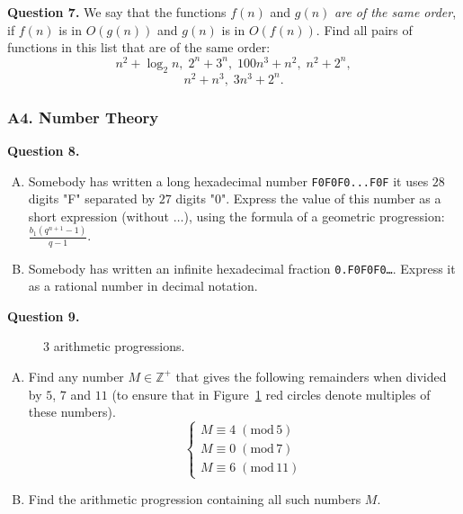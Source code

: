 \documentclass[jou]{apa6}
\begin{document}
\vspace{6pt}
{\bf Question 7.} We say that the functions $f(n)$ and $g(n)$
{\em are of the same order}, if $f(n)$ is in $O(g(n))$ and
$g(n)$ is in $O(f(n))$. Find all pairs of functions in this 
list that are of the same order:
$$n^2 + \log_2 n,\; 2^n + 3^n,\; 100n^3 + n^2,\; n^2 + 2^n,$$
$$n^2 + n^3,\;3n^3 + 2^n.$$






\subsubsection{A4. Number Theory}


{\bf Question 8.}
\begin{enumerate}[(A)]
\item
Somebody has written a long hexadecimal number
{\tt F0F0F0...F0F} \textendash{} it uses $28$ digits "F"
separated by $27$ digits "0". 
Express the value of this number as a short expression
(without $\ldots$), using
the formula of a geometric progression: $\frac{b_1(q^{n+1}-1)}{q - 1}$. 
\item 
Somebody has written an infinite hexadecimal fraction 
{\tt 0.F0F0F0\ldots}. Express it as a rational number in 
decimal notation. 
\end{enumerate}



\vspace{6pt}
{\bf Question 9.} 

\begin{figure}[!htb]
\caption{\label{fig:arithmetic-sequences} 3 arithmetic progressions.}
\end{figure}

\begin{enumerate}[(A)]
\item Find any number $M \in \mathbb{Z}^{+}$ 
that gives the following remainders when divided by 
$5$, $7$ and $11$ (to ensure that in Figure~\ref{fig:arithmetic-sequences}
red circles denote multiples of these numbers). 
$$\left\{
\begin{array}{l}
M \equiv 4\;(\text{mod}\,5)\\
M \equiv 0\;(\text{mod}\,7)\\
M \equiv 6\;(\text{mod}\,11)
\end{array} \right.$$
\item Find the arithmetic progression containing all such numbers $M$.
\end{enumerate}
\end{document}
